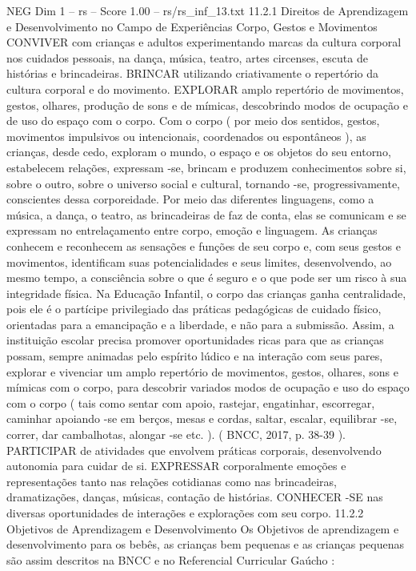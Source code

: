 \begin{textsample}{NEG Dim 1 – rs – Score 1.00 – rs/rs\_inf\_13.txt}  \label{ex:f1_neg_081}
11.2.1 Direitos de Aprendizagem e Desenvolvimento no Campo de Experiências Corpo, Gestos e Movimentos CONVIVER com crianças e adultos experimentando marcas da cultura corporal nos cuidados pessoais, na dança, música, teatro, artes circenses, escuta de histórias e brincadeiras.
BRINCAR utilizando criativamente o repertório da cultura corporal e do movimento.
EXPLORAR amplo repertório de movimentos, gestos, olhares, produção de sons e de mímicas, descobrindo modos de ocupação e de uso do espaço com o corpo.
Com o corpo ( por meio dos sentidos, gestos, movimentos impulsivos ou intencionais, coordenados ou espontâneos ), as crianças, desde cedo, exploram o mundo, o espaço e os objetos do seu entorno, estabelecem relações, expressam -se, brincam e produzem conhecimentos sobre si, sobre o outro, sobre o universo social e cultural, tornando -se, progressivamente, conscientes dessa corporeidade.
Por meio das diferentes linguagens, como a música, a dança, o teatro, as brincadeiras de faz de conta, elas se comunicam e se expressam no entrelaçamento entre corpo, emoção e linguagem.
As crianças conhecem e reconhecem as sensações e funções de seu corpo e, com seus gestos e movimentos, identificam suas potencialidades e seus limites, desenvolvendo, ao mesmo tempo, a consciência sobre o que é seguro e o que pode ser um risco à sua integridade física.
Na Educação Infantil, o corpo das crianças ganha centralidade, pois ele é o partícipe privilegiado das práticas pedagógicas de cuidado físico, orientadas para a emancipação e a liberdade, e não para a submissão.
Assim, a instituição escolar precisa promover oportunidades ricas para que as crianças possam, sempre animadas pelo espírito lúdico e na interação com seus pares, explorar e vivenciar um amplo repertório de movimentos, gestos, olhares, sons e mímicas com o corpo, para descobrir variados modos de ocupação e uso do espaço com o corpo ( tais como sentar com apoio, rastejar, engatinhar, escorregar, caminhar apoiando -se em berços, mesas e cordas, saltar, escalar, equilibrar -se, correr, dar cambalhotas, alongar -se etc. ). ( BNCC, 2017, p. 38-39 ).
PARTICIPAR de atividades que envolvem práticas corporais, desenvolvendo autonomia para cuidar de si.
EXPRESSAR corporalmente emoções e representações tanto nas relações cotidianas como nas brincadeiras, dramatizações, danças, músicas, contação de histórias.
CONHECER -SE nas diversas oportunidades de interações e explorações com seu corpo. 11.2.2 Objetivos de Aprendizagem e Desenvolvimento Os Objetivos de aprendizagem e desenvolvimento para os bebês, as crianças bem pequenas e as crianças pequenas são assim descritos na BNCC e no Referencial Curricular Gaúcho :

\end{textsample}
